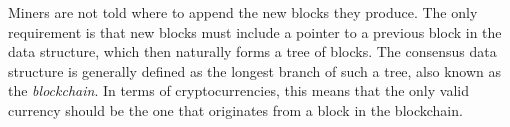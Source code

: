 \documentclass[a4paper,english,cleveref, autoref,numberwithinsect]{lipics-v2019}
\begin{document}
Miners are not told where to append the new blocks they produce. The only requirement is that new blocks must include a pointer to a previous block in the data structure, 
which then naturally forms a tree of blocks. The consensus data structure is generally defined as the longest branch of such a tree, also known as the \emph{blockchain}. In terms of cryptocurrencies, this means that the only valid currency should be the one that originates from a 
block in the blockchain. 
%
%
%
\end{document}
